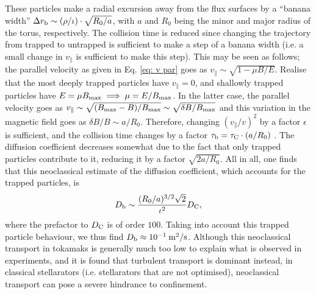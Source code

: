 These particles make a radial excursion away from the flux surfaces by a ``banana width'' $\Delta r_{\rm b} \sim (\rho / \iota)\cdot \sqrt{R_0/a} $, with $a$ and $R_0$ being the minor and major radius of the torus, respectively. The collision time is reduced since changing the trajectory from trapped to untrapped is sufficient to make a step of a banana width (i.e. a small change in $v_\parallel$ is sufficient to make this step). This may be seen as follows; the parallel velocity as given in Eq. \eqref{eq: v par} goes as $v_\parallel \sim \sqrt{1-\mu B/E}$. Realise that the most deeply trapped particles have $v_\parallel=0$, and shallowly trapped particles have $E=\mu B_{\rm max} \implies \mu =E / B_{\rm max}$. In the latter case, the parallel velocity goes as $v_\parallel \sim \sqrt{(B_{\rm max} - B)/B_{\rm max}}\sim \sqrt{\delta B/B_{\rm max}}$ and this variation in the magnetic field goes as $\delta B/B \sim a/R_0$. Therefore, changing $(v_\parallel/v)^2$ by a factor $\epsilon$ is sufficient, and the collision time changes by a factor $\tau_{\rm b} = \tau_{\rm C} \cdot (a/R_0)$  \cite{helander2005collisional}. The diffusion coefficient decreases somewhat due to the fact that only trapped particles contribute to it, reducing it by a factor $\sqrt{2 a /R_0}$. All in all, one finds that this neoclassical estimate of the diffusion coefficient, which accounts for the trapped particles, is
\begin{equation}
    D_{\rm b} \sim \frac{(R_0/a)^{3/2}\sqrt{2} }{\iota^2} D_{\rm C},
\end{equation}
where the prefactor to $D_{\rm C}$ is of order $100$. Taking into account this trapped particle behaviour, we thus find $D_{\rm b} \approx 10^{-1} \: {\rm m^2/s}$. Although this neoclassical transport in tokamaks is generally much too low to explain what is observed in experiments, and it is found that turbulent transport is dominant instead, in classical stellarators (i.e. stellarators that are not optimised), neoclassical transport can pose a severe hindrance to confinement.

